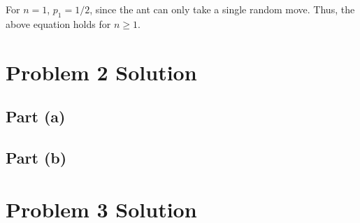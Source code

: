 \documentclass[11pt,a4paper,titlepage]{article}
\begin{document}
For $n = 1$, $p_1 = 1/2$, since the ant can only take a single random move.
Thus, the above equation holds for $n \ge 1$.


\section*{Problem 2 Solution}
\subsection*{Part (a)}

\subsection*{Part (b)}


\section*{Problem 3 Solution}
\end{document}
